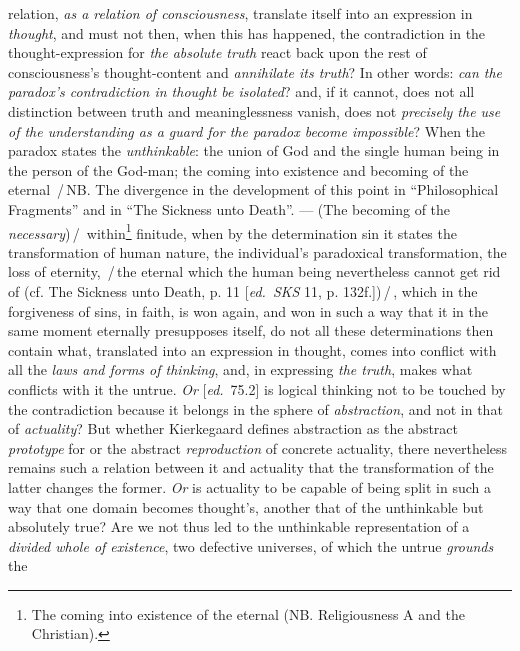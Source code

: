 \documentclass[12pt,a4paper,openany]{book}
\newcommand{\kpage}[1]{\marginnote{\footnotesize\textit{[#1]}}}
\newcommand{\ed}[1]{{\small[\textit{ed.}\ #1]}}
\newcommand{\ins}[1]{\,/\,#1\,/\,}
\begin{document}
relation, \emph{as a relation of consciousness},
translate itself into an expression in \emph{thought}, and must not then, when this has
happened, the contradiction in the thought-expression for \emph{the absolute truth} react
back upon the rest of consciousness's thought-content and \emph{annihilate its
truth}? In other words: \emph{can the paradox's contradiction in thought be isolated}? and,
if it cannot, does not all distinction between
truth and meaninglessness vanish, does not \emph{precisely the use of the understanding as a
guard for the paradox become impossible}? When the paradox states the \emph{unthinkable}: the union
of God and the single human being in the person of the God-man;
the coming into existence and becoming of the eternal \ins{NB. The divergence in the development of
this point in ``Philosophical Fragments'' and in ``The Sickness unto Death''.
--- (The becoming of the \emph{necessary})} within\footnote[120]{The coming into existence of the eternal (NB. Religiousness A and the Christian).} finitude, when
by the determination sin it states the transformation of human nature,
the individual's paradoxical transformation, the loss of eternity, \ins{the
eternal which the human being nevertheless cannot get rid of (cf. The Sickness
unto Death, p. 11 \ed{\emph{SKS} 11, p. 132f.})}, which in the forgiveness of sins, in faith,
is won again, and won in such a way that it in the same moment eternally presupposes
itself, do not all these determinations then contain what,
translated into an expression in thought, comes into conflict with all the \emph{laws and
forms of thinking}, and, in expressing \emph{the truth}, makes what conflicts with it
the untrue. \emph{Or} \ed{75.2} is logical thinking not to be touched
by the contradiction because it belongs in the sphere of \emph{abstraction},
and not in that of \emph{actuality}? But whether Kierkegaard defines
\kpage{169}abstraction as the abstract \emph{prototype} for or the abstract
\emph{reproduction} of concrete actuality, there nevertheless remains such a relation
between it and actuality that the transformation of the latter changes
the former. \emph{Or} is actuality to be capable of being split in such a way that one domain
becomes thought's, another that of the unthinkable but absolutely true?
Are we not thus led to the unthinkable representation of a \emph{divided
whole of existence}, two defective universes, of which the untrue \emph{grounds} the
\end{document}

